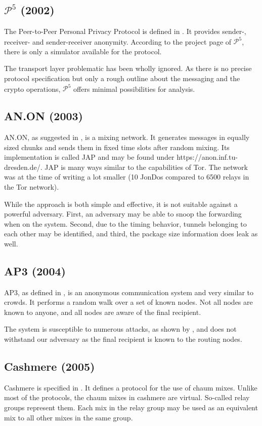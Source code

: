 \subsection{\texorpdfstring{$\mathcal{P}^5$}{P5} (2002)}
The Peer-to-Peer Personal Privacy Protocol is defined in \cite{sherwood-protocol}. It provides sender-, receiver- and sender-receiver anonymity. According to the project page of $\mathcal{P}^5$, there is only a simulator available for the protocol.

The transport layer problematic has been wholly ignored. As there is no precise protocol specification but only a rough outline about the messaging and the crypto operations, $\mathcal{P}^5$ offers minimal possibilities for analysis.

\subsection{AN.ON (2003)}
AN.ON, as suggested in \cite{federrath2003system}, is a mixing network. It generates messages in equally sized chunks and sends them in fixed time slots after random mixing. Its implementation is called JAP and may be found under https://anon.inf.tu-dresden.de/. JAP is many ways similar to the capabilities of Tor. The network was at the time of writing a lot smaller (10 JonDos compared to 6500 relays in the Tor network).

While the approach is both simple and effective, it is not suitable against a powerful adversary. First, an adversary may be able{\tiny } to snoop the forwarding when on the system. Second, due to the timing behavior, tunnels belonging to each other may be identified, and third, the package size information does leak as well.


\subsection{AP3 (2004)}
AP3, as defined in \cite{mislove2004ap3}, is an anonymous communication system and very similar to crowds. It performs a random walk over a set of known nodes. Not all nodes are known to anyone, and all nodes are aware of the final recipient. 

The system is susceptible to numerous attacks, as shown by \cite{ccs2008:mittal}, and does not withstand our adversary as the final recipient is known to the routing nodes.

\subsection{Cashmere (2005)}
Cashmere is specified in \cite{zhuang2005cashmere}. It defines a protocol for the use of chaum mixes. Unlike most of the protocols, the chaum mixes in cashmere are virtual. So-called relay groups represent them. Each mix in the relay group may be used as an equivalent mix to all other mixes in the same group. 

